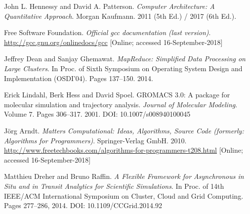 \documentclass{pfc}
\begin{document}
\begin{thebibliography}{9}\label{bib}

 John L. Hennessy and David A. Patterson.
  \textit{Computer Architecture: A Quantitative Approach}.
  Morgan Kaufmann. 2011 (5th Ed.) / 2017 (6th Ed.).

 Free Software Foundation.
  \textit{Official gcc documentation (last version)}.
  \\ {\footnotesize \url{http://gcc.gnu.org/onlinedocs/gcc}}
  {\footnotesize [Online; accessed 16-September-2018]}

 Jeffrey Dean and Sanjay Ghemawat.
  \textit{MapReduce: Simplified Data Processing on Large Clusters}.
  In Proc. of Sixth Symposium on Operating System Design and
  Implementation (OSDI'04). Pages 137--150. 2014.

 Erick Lindahl, Berk Hess and David Spoel.
  GROMACS 3.0: A package for molecular simulation and trajectory analysis.
  \textit{Journal of Molecular Modeling}. Volume 7. Pages 306--317. 2001.
  DOI: 10.1007/s008940100045

 J{\"o}rg Arndt.
  \textit{Matters Computational: Ideas, Algorithms, Source Code
    (formerly: Algorithms for Programmers)}.
  Springer-Verlag GmbH. 2010.
  \\ {\footnotesize
    \url{http://www.freetechbooks.com/algorithms-for-programmers-t208.html}}
  {\footnotesize [Online; accessed 16-September-2018]}

 Matthieu Dreher and Bruno Raffin.
  \textit{A Flexible Framework for Asynchronous in Situ and in Transit Analytics for Scientific Simulations}.
  In Proc. of 14th IEEE/ACM International Symposium on Cluster, Cloud
  and Grid Computing. Pages 277--286, 2014.
  DOI: 10.1109/CCGrid.2014.92

\end{thebibliography}
\end{document}
